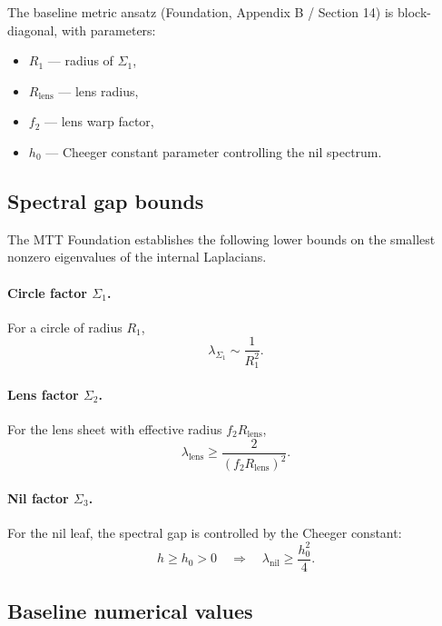 \documentclass[11pt]{article}
\begin{document}
The baseline metric ansatz (Foundation, Appendix B / Section 14) is block-diagonal,
with parameters:
\begin{itemize}
\item $R_1$ — radius of $\Sigma_1$,
\item $R_{\mathrm{lens}}$ — lens radius,
\item $f_2$ — lens warp factor,
\item $h_0$ — Cheeger constant parameter controlling the nil spectrum.
\end{itemize}

\subsection{Spectral gap bounds}

The MTT Foundation establishes the following lower bounds on the smallest
nonzero eigenvalues of the internal Laplacians.

\paragraph{Circle factor $\Sigma_1$.}
For a circle of radius $R_1$,
\begin{equation}
\lambda_{\Sigma_1} \sim \frac{1}{R_1^2}.
\label{eq:gapSigma1}
\end{equation}

\paragraph{Lens factor $\Sigma_2$.}
For the lens sheet with effective radius $f_2R_{\mathrm{lens}}$,
\begin{equation}
\lambda_{\mathrm{lens}} \ge \frac{2}{(f_2R_{\mathrm{lens}})^2}.
\label{eq:gapLens}
\end{equation}

\paragraph{Nil factor $\Sigma_3$.}
For the nil leaf, the spectral gap is controlled by the Cheeger constant:
\begin{equation}
h \ge h_0 > 0
\quad\Rightarrow\quad
\lambda_{\mathrm{nil}} \ge \frac{h_0^2}{4}.
\label{eq:gapNil}
\end{equation}

\subsection{Baseline numerical values}
\end{document}
